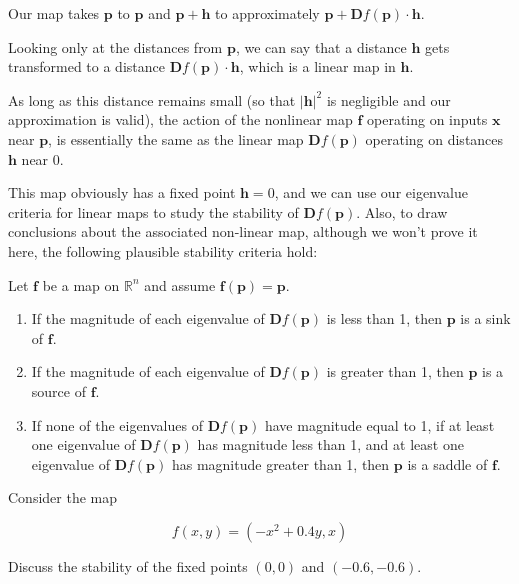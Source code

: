 Our map takes $\mathbf p$ to $\mathbf p$ and ${\mathbf p} + {\mathbf h}$ to approximately $\mathbf p + {\mathbf Df}({\mathbf p}) \cdot {\mathbf h}$.

Looking only at the distances from $\mathbf p$, we can say that a distance $\mathbf h$  gets transformed to a distance ${\mathbf Df}({\mathbf p}) \cdot {\mathbf h}$, which is a linear map in $\mathbf h$. 

As long as this distance remains small (so that $|{\mathbf h}|^2$ is negligible and our approximation is valid), the action of the nonlinear map $\mathbf f$ operating on inputs $\mathbf x$ near ${\mathbf p}$, is essentially the same as the linear map ${\mathbf Df}({\mathbf p})$ operating on distances $\mathbf h$ near 0.

This map obviously has a fixed point ${\mathbf h} = 0$, and we can use our eigenvalue criteria for linear maps to study the stability of ${\mathbf Df}({\mathbf p})$. Also, to draw conclusions about the associated non-linear map, although we won't prove it here, the following plausible stability criteria hold:

Let ${\mathbf f}$ be a map on $\mathbb{R}^n$ and assume ${\mathbf f}({\mathbf p})={\mathbf p}$.

\begin{enumerate}
\item
If the magnitude of each eigenvalue of ${\mathbf Df}({\mathbf p})$ is less than 1, then ${\mathbf p}$ is a sink of ${\mathbf f}$.
\item
If the magnitude of each eigenvalue of ${\mathbf Df}({\mathbf p})$ is greater than 1, then ${\mathbf p}$ is a source of ${\mathbf f}$.
\item
\noindent{}If none of the eigenvalues of ${\mathbf Df}({\mathbf p})$ have magnitude equal to 1, if at least one eigenvalue of ${\mathbf Df}({\mathbf p})$ has magnitude less than 1, and at least one eigenvalue of ${\mathbf Df}({\mathbf p})$ has magnitude greater than 1, then ${\mathbf p}$ is a saddle of ${\mathbf f}$.
\end{enumerate}

\pagebreak

\begin{exer}
Consider the map 

$$f(x,y) = (-x^2+0.4y, x)$$

Discuss the stability of the fixed points $(0,0)$ and $(-0.6,-0.6)$.

\end{exer}

